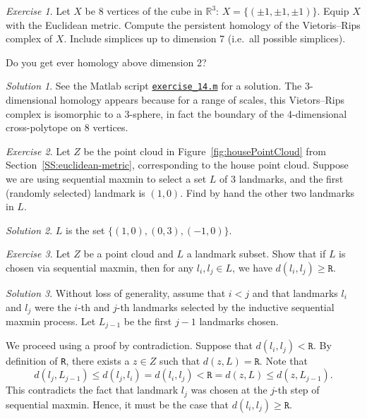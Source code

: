 \documentclass[amscd, amssymb, verbatim]{amsart}[12pt]
\theoremstyle{remark}
\theoremstyle{remark}
\newtheorem{exerciseSol}{Exercise}
\theoremstyle{remark}
\newtheorem*{solution}{Solution}
\newcommand{\R}{\mathbb{R}}
\begin{document}
\begin{exerciseSol}
Let $X$ be 8 vertices of the cube in $\R^3$: $X=\{(\pm1, \pm1, \pm1)\}$. Equip $X$ with the Euclidean metric. Compute the persistent homology of the Vietoris--Rips complex of $X$. Include simplices up to dimension 7 (i.e.\ all possible simplices).

Do you get ever homology above dimension 2?
\end{exerciseSol}

\begin{solution}
See the Matlab script \href{https://github.com/appliedtopology/javaplex/tree/master/src/matlab/for_distribution/tutorial_solutions/exercise_14.m}{\texttt{exercise\_14.m}} for a solution. The 3-dimensional homology appears because for a range of scales, this Vietors--Rips complex is isomorphic to a 3-sphere, in fact the boundary of the 4-dimensional cross-polytope on 8 vertices.
\end{solution}

\begin{exerciseSol}
Let $Z$ be the point cloud in Figure~\ref{fig:housePointCloud} from Section~\ref{SS:euclidean-metric}, corresponding to the house point cloud. Suppose we are using sequential maxmin to select a set $L$ of 3 landmarks, and the first (randomly selected) landmark is $(1,0)$. Find by hand the other two landmarks in $L$.
\end{exerciseSol}

\begin{solution}
$L$ is the set $\{(1, 0), (0, 3), (-1, 0)\}$. 
\end{solution}

\begin{exerciseSol}
Let $Z$ be a point cloud and $L$ a landmark subset. Show that if $L$ is chosen via sequential maxmin, then for any $l_i,l_j\in L$, we have $d(l_i,l_j)\geq\texttt{R}$.
\end{exerciseSol}

\begin{solution}
Without loss of generality, assume that $i < j$ and that landmarks $l_i$ and $l_j$ were the $i$-th and $j$-th landmarks selected by the inductive sequential maxmin process. Let $L_{j-1}$ be the first $j - 1$ landmarks chosen. 

We proceed using a proof by contradiction. Suppose that $d(l_i, l_j) < \texttt{R}$. By definition of \texttt{R}, there exists a $z \in Z$ such that $d(z,L) = \texttt{R}$. Note that
$$d(l_j, L_{j-1}) \leq d(l_j, l_i) = d(l_i, l_j) < \texttt{R} = d(z,L) \leq d(z, L_{j-1}).$$
This contradicts the fact that landmark $l_j$ was chosen at the $j$-th step of sequential maxmin. Hence, it must be the case that $d(l_i, l_j) \geq \texttt{R}$. 
\end{solution}
\end{document}
